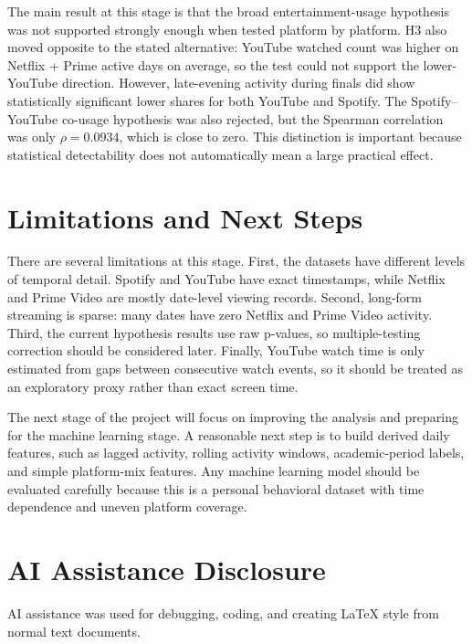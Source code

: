 \documentclass[11pt,a4paper]{article}
\begin{document}
The main result at this stage is that the broad entertainment-usage hypothesis was not supported strongly enough when tested platform by platform. H3 also moved opposite to the stated alternative: YouTube watched count was higher on Netflix + Prime active days on average, so the test could not support the lower-YouTube direction. However, late-evening activity during finals did show statistically significant lower shares for both YouTube and Spotify. The Spotify--YouTube co-usage hypothesis was also rejected, but the Spearman correlation was only $\rho=0.0934$, which is close to zero. This distinction is important because statistical detectability does not automatically mean a large practical effect.

\section*{Limitations and Next Steps}
There are several limitations at this stage. First, the datasets have different levels of temporal detail. Spotify and YouTube have exact timestamps, while Netflix and Prime Video are mostly date-level viewing records. Second, long-form streaming is sparse: many dates have zero Netflix and Prime Video activity. Third, the current hypothesis results use raw p-values, so multiple-testing correction should be considered later. Finally, YouTube watch time is only estimated from gaps between consecutive watch events, so it should be treated as an exploratory proxy rather than exact screen time.

The next stage of the project will focus on improving the analysis and preparing for the machine learning stage. A reasonable next step is to build derived daily features, such as lagged activity, rolling activity windows, academic-period labels, and simple platform-mix features. Any machine learning model should be evaluated carefully because this is a personal behavioral dataset with time dependence and uneven platform coverage.

\section*{AI Assistance Disclosure}
AI assistance was used for debugging, coding, and creating LaTeX style from normal text documents.

\clearpage
\appendix
{}
\end{document}
